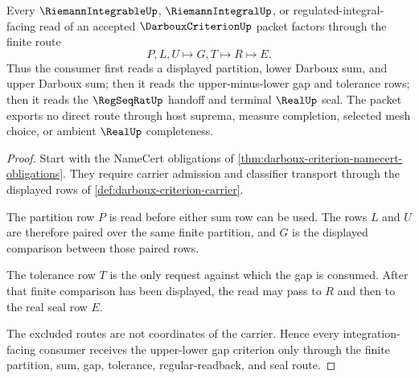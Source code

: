 \begin{theorem}
\label{thm:darboux-criterion-upper-lower-gap-route}
Every $\RiemannIntegrableUp$, $\RiemannIntegralUp$, or regulated-integral-facing read of an accepted $\DarbouxCriterionUp$ packet factors through the finite route
$$
P,L,U \longmapsto G,T \longmapsto R \longmapsto E .
$$
Thus the consumer first reads a displayed partition, lower Darboux sum, and upper Darboux sum; then it reads the upper-minus-lower gap and tolerance rows; then it reads the $\RegSeqRatUp$ handoff and terminal $\RealUp$ seal. The packet exports no direct route through host suprema, measure completion, selected mesh choice, or ambient $\RealUp$ completeness.
\end{theorem}
\begin{proof}
Start with the NameCert obligations of \autoref{thm:darboux-criterion-namecert-obligations}. They require carrier admission and classifier transport through the displayed rows of \autoref{def:darboux-criterion-carrier}.

The partition row $P$ is read before either sum row can be used. The rows $L$ and $U$ are therefore paired over the same finite partition, and $G$ is the displayed comparison between those paired rows.

The tolerance row $T$ is the only request against which the gap is consumed. After that finite comparison has been displayed, the read may pass to $R$ and then to the real seal row $E$.

The excluded routes are not coordinates of the carrier. Hence every integration-facing consumer receives the upper-lower gap criterion only through the finite partition, sum, gap, tolerance, regular-readback, and seal route.
\end{proof}


\begin{closurestatus}{\DarbouxCriterionUp}
  \theoryclosure{\seedClosure}
  \formalstatus{\unformalizedV}
\end{closurestatus}
